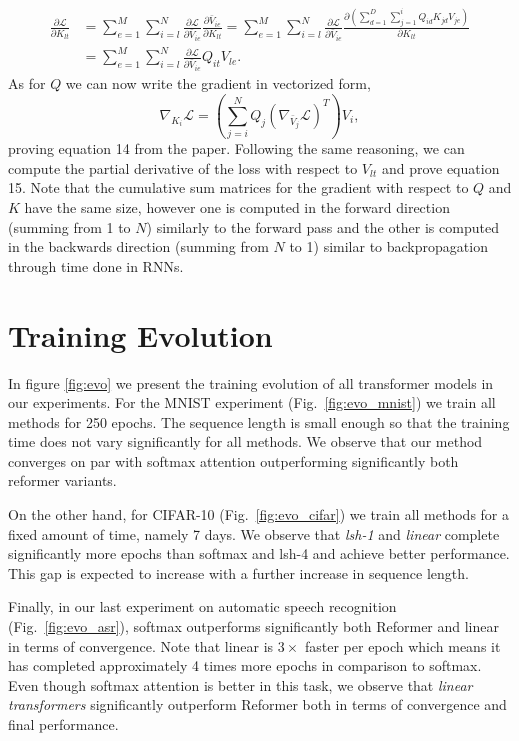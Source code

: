 \documentclass{article}
\newcommand{\linears}{\emph{linear transformers}}
\newcommand{\calL}{\mathcal{L}}
\newcommand{\der}[2]{\frac{\partial #1}{\partial #2}}
\begin{document}
\begin{equation}
\begin{aligned}
    \der{\calL}{K_{lt}} &=
        \sum_{e=1}^M \sum_{i=l}^N \der{\calL}{\bar{V}_{ie}} \der{\bar{V}_{ie}}{K_{lt}} =
        \sum_{e=1}^M \sum_{i=l}^N \der{\calL}{\bar{V}_{ie}}
        \der{\left(\sum_{d=1}^D \sum_{j=1}^i Q_{id} K_{jd} V_{je}\right)}{K_{lt}} \\
     &= \sum_{e=1}^M \sum_{i=l}^N \der{\calL}{\bar{V}_{ie}} Q_{it} V_{le}.
\end{aligned}
\end{equation}
As for $Q$ we can now write the gradient in vectorized form,
\begin{equation}
    \nabla_{K_i} \calL = \left(
        \sum_{j=i}^N Q_j \left(\nabla_{\bar{V}_j} \calL\right)^T
        \right) V_i,
\end{equation}
proving equation 14 from the paper. Following the same reasoning, we can
compute the partial derivative of the loss with respect to $V_{lt}$ and prove
equation 15. Note that the cumulative sum matrices for the gradient with
respect to $Q$ and $K$ have the same size, however one is computed in the
forward direction (summing from 1 to $N$) similarly to the forward pass and the
other is computed in the backwards direction (summing from $N$ to 1) similar to
backpropagation through time done in RNNs.

\section{Training Evolution}

In figure \ref{fig:evo} we present the training evolution of all transformer
models in our experiments. For the MNIST experiment (Fig.~\ref{fig:evo_mnist})
we train all methods for 250 epochs. The sequence length is small enough so
that the training time does not vary significantly for all methods. We observe
that our method converges on par with softmax attention outperforming
significantly both reformer variants.

On the other hand, for CIFAR-10 (Fig.~\ref{fig:evo_cifar}) we train all methods
for a fixed amount of time, namely 7 days. We observe that \emph{lsh-1} and
\emph{linear} complete significantly more epochs than softmax and lsh-4 and
achieve better performance. This gap is expected to increase with a further
increase in sequence length.

Finally, in our last experiment on automatic speech recognition
(Fig.~\ref{fig:evo_asr}), softmax outperforms significantly both Reformer and
linear in terms of convergence. Note that linear is $3\times$ faster per epoch
which means it has completed approximately 4 times more epochs in comparison to
softmax. Even though softmax attention is better in this task, we observe that
\linears{} significantly outperform Reformer both in terms of convergence and
final performance.
\end{document}
